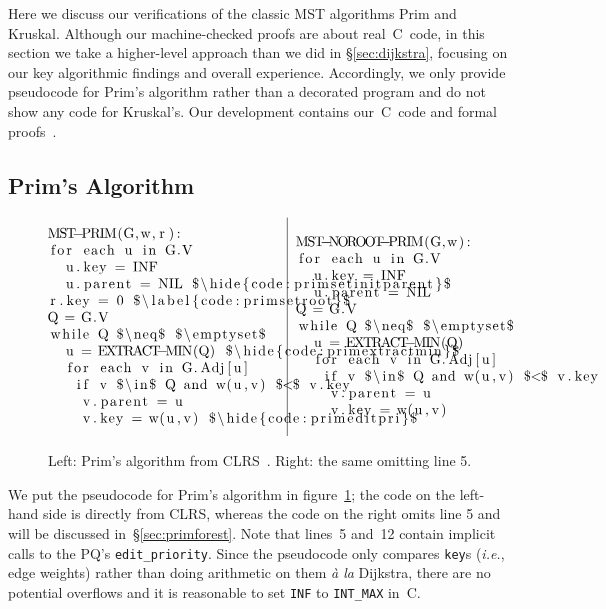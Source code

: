 Here we discuss our verifications of the classic MST algorithms Prim and Kruskal.  Although our machine-checked proofs are about real~C~code, in this section we take a higher-level approach than we did in \S\ref{sec:dijkstra}, focusing on our key algorithmic findings and overall experience.  Accordingly, we only provide pseudocode for Prim's algorithm rather than a decorated program and do not show any code for Kruskal's.  Our development contains our~C~code and formal proofs~\cite{blah}.

\subsection{Prim's Algorithm}
\label{sec:prim}

\begin{figure}
\[
\begin{array}{@{}l@{~~}|@{~~}l@{}}
\begin{minipage}{0.475\textwidth}
\begin{lstlisting}
MST-PRIM(G,w,r):
 for each u in G.V
  u.key = INF
  u.parent = NIL $\hide{code:primsetinitparent}$
 r.key = 0 $\label{code:primsetroot}$
 Q = G.V
 while Q $\neq$ $\emptyset$
  u = EXTRACT-MIN(Q) $\hide{code:primextractmin}$
  for each v in G.Adj[u]
   if v $\in$ Q and w(u,v) $<$ v.key
    v.parent = u
    v.key = w(u,v) $\hide{code:primeditpri}$
\end{lstlisting} \end{minipage} &
\begin{minipage}{0.5\textwidth}
\begin{lstlisting}[numbers=none]
MST-NOROOT-PRIM(G,w):
 for each u in G.V
  u.key = INF
  u.parent = NIL

 Q = G.V
 while Q $\neq$ $\emptyset$
  u = EXTRACT-MIN(Q)
  for each v in G.Adj[u]
   if v $\in$ Q and w(u,v) $<$ v.key
    v.parent = u
    v.key = w(u,v)
\end{lstlisting}
\end{minipage}
\end{array}
\]
\caption{Left: Prim's algorithm from CLRS~\cite{clrs}. Right: the same omitting line 5.}
\label{fig:prims}
\end{figure}

We put the pseudocode for Prim's algorithm in figure~\ref{fig:prims}; the code on the left-hand side is directly from CLRS, whereas the code on the right omits line 5 and will be discussed in~\S\ref{sec:primforest}.  Note that lines~5 and~12 contain implicit calls to the PQ's \texttt{edit\_priority}.  Since the pseudocode only compares \texttt{key}s (\emph{i.e.}, edge weights) rather than doing arithmetic on them \emph{\`a la} Dijkstra, there are no potential overflows and it is reasonable to set \texttt{INF} to \texttt{INT\_MAX} in~C.

